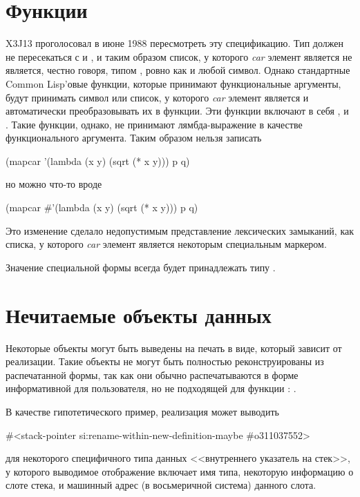 \section{Функции}
\begin{newer}
X3J13 проголосовал в июне 1988 
пересмотреть эту спецификацию. Тип  должен не пересекаться с
 и , и таким образом список, у которого \emph{car} элемент
является  не является, честно говоря, типом , ровно
как и любой символ.
Однако стандартные Common Lisp'овые функции, которые принимают функциональные
аргументы, будут принимать символ или список, у которого \emph{car} элемент
является  и автоматически преобразовывать их в функции. Эти функции
включают в себя ,  и .
Такие функции, однако, не принимают лямбда-выражение в качестве функционального
аргумента. Таким образом нельзя записать
\vskip 3pt
\begin{lisp}
(mapcar '(lambda (x y) (sqrt (* x y))) p q)
\end{lisp}
но можно что-то вроде
\begin{lisp}
(mapcar \#'(lambda (x y) (sqrt (* x y))) p q)
\end{lisp}

Это изменение сделало недопустимым представление лексических замыканий, как
списка, у которого \emph{car} элемент является некоторым специальным маркером.

Значение специальной формы  всегда будет принадлежать типу .
\end{newer}


\section{Нечитаемые объекты данных}

Некоторые объекты могут быть выведены на печать в виде, который зависит от
реализации.
Такие объекты не могут быть полностью реконструированы из распечатанной формы,
так как они обычно распечатываются в форме информативной для пользователя, но не
подходящей для функции :
.

В качестве гипотетического пример, реализация может выводить 
\begin{lisp}
\#<stack-pointer si:rename-within-new-definition-maybe \#o311037552>
\end{lisp}
для некоторого специфичного типа данных <<внутреннего указатель на стек>>, у
которого выводимое отображение включает имя типа, некоторую информацию о слоте
стека, и машинный адрес (в восьмеричной система) данного слота.

